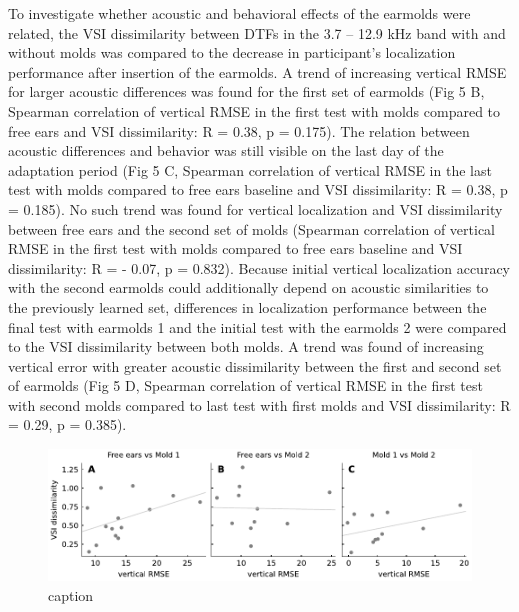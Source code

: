 To investigate whether acoustic and behavioral effects of the earmolds were related, the VSI dissimilarity between DTFs in the 3.7 – 12.9 kHz band with and without molds was compared to the decrease in participant’s localization performance after insertion of the earmolds. A trend of increasing vertical RMSE for larger acoustic differences was found for the first set of earmolds (Fig 5 B, Spearman correlation of vertical RMSE in the first test with molds compared to free ears and VSI dissimilarity: R = 0.38, p = 0.175). The relation between acoustic differences and behavior was still visible on the last day of the adaptation period (Fig 5 C, Spearman correlation of vertical RMSE in the last test with molds compared to free ears baseline and VSI dissimilarity: R = 0.38, p = 0.185). No such trend was found for vertical localization and VSI dissimilarity between free ears and the second set of molds (Spearman correlation of vertical RMSE in the first test with molds compared to free ears baseline and VSI dissimilarity: R = - 0.07, p = 0.832). Because initial vertical localization accuracy with the second earmolds could additionally depend on acoustic similarities to the previously learned set, differences in localization performance between the final test with earmolds 1 and the initial test with the earmolds 2 were compared to the VSI dissimilarity between both molds. A trend was found of increasing vertical error with greater acoustic dissimilarity between the first and second set of earmolds (Fig 5 D, Spearman correlation of vertical RMSE in the first test with second molds compared to last test with first molds and VSI dissimilarity: R = 0.29, p = 0.385).\\
 
 \begin{figure}[hb]
	\includegraphics[width=12.8cm, left]{../Results/figures/fig6/fig6}
	\caption{caption}
        \label{fig:first}
\end{figure}

 
